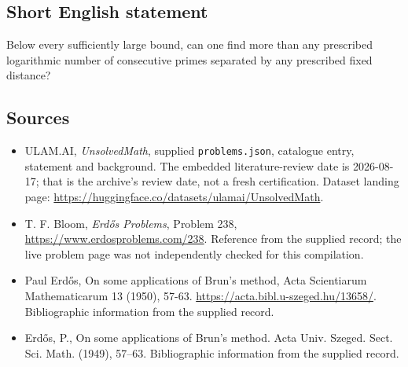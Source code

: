 \documentclass[11pt,a4paper]{article}
\begin{document}
\subsection{Short English statement}

Below every sufficiently large bound, can one find more than any prescribed logarithmic number of consecutive primes separated by any prescribed fixed distance?

\subsection{Sources}

{\small

\begin{itemize}

\item[\hypertarget{source:statement:1}{S1}] ULAM.AI, \emph{UnsolvedMath}, supplied \texttt{problems.json}, catalogue entry, statement and background. The embedded literature-review date is 2026-08-17; that is the archive’s review date, not a fresh certification. Dataset landing page: \url{https://huggingface.co/datasets/ulamai/UnsolvedMath}.

\item[\hypertarget{source:statement:2}{S2}] T. F. Bloom, \emph{Erdős Problems}, Problem 238, \url{https://www.erdosproblems.com/238}. Reference from the supplied record; the live problem page was not independently checked for this compilation.

\item[\hypertarget{source:statement:3}{S3}] Paul Erdős, On some applications of Brun's method, Acta Scientiarum Mathematicarum 13 (1950), 57-63. \url{https://acta.bibl.u-szeged.hu/13658/}. Bibliographic information from the supplied record.

\item[\hypertarget{source:statement:4}{S4}] Erd\H{o}s, P., On some applications of {B}run's method. Acta Univ. Szeged. Sect. Sci. Math. (1949), 57--63. Bibliographic information from the supplied record.

\end{itemize}

}

\label{end:statement}
\end{document}
